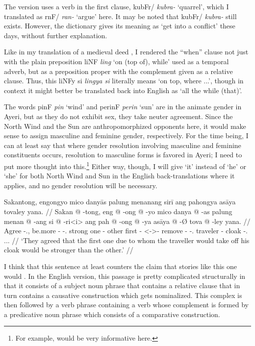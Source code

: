 \documentclass[12pt,paper=a4]{scrartcl}
\newcommand{\ayr}[1]{{\Tagati #1}}
\newcommand{\xayr}[3]{{\Tagati #1} \emph{#2} \enquote*{#3}}
\begin{document}
The \citeyear{becker2004} version uses a verb in the first clause, \xayr{kubFr/}{kubra-}{quarrel}, which I translated as \xayr{rnF/}{ran-}{argue} here. It may be noted that \ayr{kubFr/} \textit{kubra-} still exists. However, the dictionary gives its meaning as `get into a conflict' these days, without further explanation.

Like in my translation of a medieval deed \autocite[9]{becker2015}, I rendered the \enquote{when} clause not just with the plain preposition \xayr{liNF}{ling}{on (top of), while} used as a temporal adverb, but as a preposition proper with the complement given as a relative clause. Thus, this \ayr{liNFy si} \textit{lingya si} literally means `on top, where ...', though in context it might better be translated back into English as `all the while (that)'.

The words \xayr{pinF}{pin}{wind} and \xayr{perinF}{perin}{sun} are in the animate gender in Ayeri, but as they do not exhibit sex, they take neuter agreement. Since the North Wind and the Sun are anthropomorphized opponents here, it would make sense to assign masculine and feminine gender, respectively. For the time being, I can at least say that where gender resolution involving masculine and feminine constituents occurs, resolution to masculine forms is favored in Ayeri; I need to put more thought into this.\footnote{For example, \cite[Ch. 8.3 and 8.4]{corbett2006} would be very informative here.} Either way, though, I will give `it' instead of `he' or `she' for both North Wind and Sun in the English back-translations where it applies, and no gender resolution will be necessary.

\ex %
\begingl
	\glpreamble Sakantong, engongyo mico danyās palung menanang sirī ang pahongya asāya tovaley yana. //
	\gla Sakan @ -tong, eng @ -ong @ -yo mico danya @ -as palung menan @ -ang si @ -ri<i> ang pah @ -ong @ -ya asāya @ -Ø tova @ -ley yana. //
	\glb Agree -\Tpl{}.\N{}, be.more -\Irr{} -\Tsg{}.\N{} strong one -\Parg{} other first -\Aarg{} \Rel{} <-\Aarg{}>-\Ins{} \AgtT{} remove -\Irr{} -\Tsg{}.\M{} traveler -\Top{} cloak -\Parg{}.\Inan{} \Tsg{}.\M{}.\Gen{}. //
	\glft `They agreed that the first one due to whom the traveller would take off his cloak would be stronger than the other.' //
\endgl
\xe

I think that this sentence at least counters the claim that stories like this one would . In the English version, this passage is pretty complicated structurally in that it consists of a subject noun phrase that contains a relative clause that in turn contains a causative construction which gets nominalized. This complex is then followed by a verb phrase containing a verb whose complement is formed by a predicative noun phrase which consists of a comparative construction.
\end{document}
